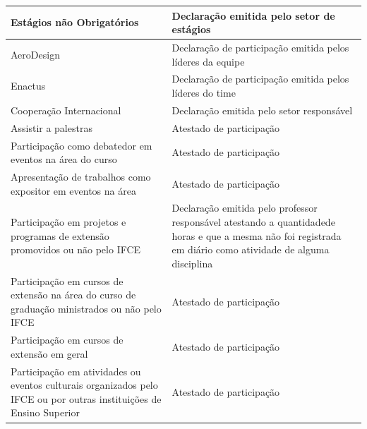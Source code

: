 \documentclass{paper}
\begin{document}
\begin{longtable}{|p{8.5cm}|p{5.5cm}|}
 \hline
 
 Estágios não Obrigatórios & Declaração emitida pelo setor de estágios \\
 
 \hline
 
 AeroDesign & Declaração de participação emitida pelos líderes da equipe \\ 
 
 \hline
 
 Enactus & Declaração de participação emitida pelos líderes do time \\
 
 \hline
 
 Cooperação Internacional & Declaração emitida pelo setor responsável \\
 
 \hline
 
 Assistir a palestras & Atestado de participação \\
 
 \hline
 
 Participação como debatedor em eventos na área do curso & Atestado de participação \\
 
 \hline
 
 Apresentação de trabalhos como expositor em eventos na área & Atestado de participação \\
 
 \hline
 
 Participação em projetos e programas de extensão promovidos ou não pelo IFCE & Declaração emitida pelo professor responsável atestando a quantidadede horas e que a mesma não foi registrada em diário como atividade de alguma disciplina \\
 
 \hline
 
 Participação em cursos de extensão na área do curso de graduação ministrados ou não pelo IFCE & Atestado de participação \\
 
 \hline
 
 Participação em cursos de extensão em geral & Atestado de participação \\
 
 \hline
 
 Participação em atividades ou eventos culturais organizados pelo IFCE ou por outras instituições de Ensino Superior & Atestado de participação \\
 
 \hline
 

\end{longtable}
\end{document}
